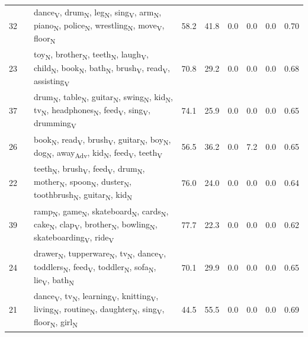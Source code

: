 \begin{landscape}
\begin{xltabular}{\linewidth}{r >{\raggedright\arraybackslash}p{2.9cm} >{\raggedright\arraybackslash}X r r r r r r}
32 &  & dance\textsubscript{V}, drum\textsubscript{N}, leg\textsubscript{N}, sing\textsubscript{V}, arm\textsubscript{N}, piano\textsubscript{N}, police\textsubscript{N}, wrestling\textsubscript{N}, move\textsubscript{V}, floor\textsubscript{N} & 58.2 & 41.8 & 0.0 & 0.0 & 0.0 & 0.70 \\
23 &  & toy\textsubscript{N}, brother\textsubscript{N}, teeth\textsubscript{N}, laugh\textsubscript{V}, child\textsubscript{N}, book\textsubscript{N}, bath\textsubscript{N}, brush\textsubscript{V}, read\textsubscript{V}, assisting\textsubscript{V} & 70.8 & 29.2 & 0.0 & 0.0 & 0.0 & 0.68 \\
37 &  & drum\textsubscript{N}, table\textsubscript{N}, guitar\textsubscript{N}, swing\textsubscript{N}, kid\textsubscript{N}, tv\textsubscript{N}, headphones\textsubscript{N}, feed\textsubscript{V}, sing\textsubscript{V}, drumming\textsubscript{V} & 74.1 & 25.9 & 0.0 & 0.0 & 0.0 & 0.65 \\
26 &  & book\textsubscript{N}, read\textsubscript{V}, brush\textsubscript{V}, guitar\textsubscript{N}, boy\textsubscript{N}, dog\textsubscript{N}, away\textsubscript{Adv}, kid\textsubscript{N}, feed\textsubscript{V}, teeth\textsubscript{V} & 56.5 & 36.2 & 0.0 & 7.2 & 0.0 & 0.65 \\
22 &  & teeth\textsubscript{N}, brush\textsubscript{V}, feed\textsubscript{V}, drum\textsubscript{N}, mother\textsubscript{N}, spoon\textsubscript{N}, duster\textsubscript{N}, toothbrush\textsubscript{N}, guitar\textsubscript{N}, kid\textsubscript{N} & 76.0 & 24.0 & 0.0 & 0.0 & 0.0 & 0.64 \\
39 &  & ramp\textsubscript{N}, game\textsubscript{N}, skateboard\textsubscript{N}, cards\textsubscript{N}, cake\textsubscript{N}, clap\textsubscript{V}, brother\textsubscript{N}, bowling\textsubscript{N}, skateboarding\textsubscript{V}, ride\textsubscript{V} & 77.7 & 22.3 & 0.0 & 0.0 & 0.0 & 0.62 \\
24 &  & drawer\textsubscript{N}, tupperware\textsubscript{N}, tv\textsubscript{N}, dance\textsubscript{V}, toddlers\textsubscript{N}, feed\textsubscript{V}, toddler\textsubscript{N}, sofa\textsubscript{N}, lie\textsubscript{V}, bath\textsubscript{N} & 70.1 & 29.9 & 0.0 & 0.0 & 0.0 & 0.65 \\
21 &  & dance\textsubscript{V}, tv\textsubscript{N}, learning\textsubscript{V}, knitting\textsubscript{V}, living\textsubscript{N}, routine\textsubscript{N}, daughter\textsubscript{N}, sing\textsubscript{V}, floor\textsubscript{N}, girl\textsubscript{N} & 44.5 & 55.5 & 0.0 & 0.0 & 0.0 & 0.69 \\

\end{xltabular}
\end{landscape}
